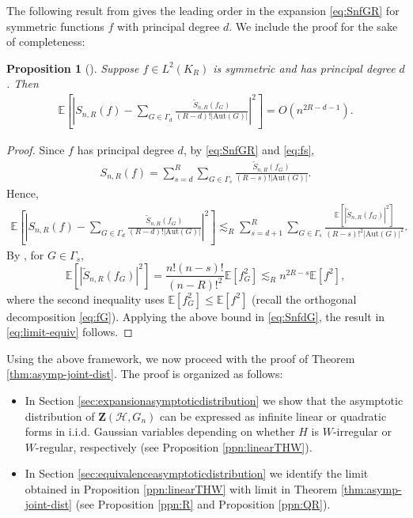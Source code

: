 \documentclass[11pt,reqno]{amsart}
\numberwithin{equation}{section}
\newcommand{\cH}{{\mathcal H}}
\newtheorem{prop}{Proposition}[section]
\theoremstyle{definition}
\begin{document}
The following result from  \cite{janson1991asymptotic} gives the leading order in the expansion \eqref{eq:SnfGR} for symmetric functions $f$ with principal degree $d$. We include the proof for the sake of completeness: 


\begin{prop}[\cite{janson1991asymptotic}]
\label{ppn:Sn}
Suppose $f \in L^{2}(K_R)$ is symmetric and has principal degree $d$. Then 
\begin{align}\label{eq:limit-equiv}
   \mathbb E\left[\left|S_{n,R}(f) - \sum_{G\in\Gamma_{d}}\frac{\tilde{S}_{n,R}(f_{G})}{(R-d)!|\mathrm{Aut}(G)|} \right|^2\right] = O(n^{2R - d -1}) .  
\end{align} 
\end{prop}

\begin{proof} 
Since $f$ has principal degree $d$, by \eqref{eq:SnfGR} and \eqref{eq:fs}, 
\begin{align*}
S_{n,R}(f) = \sum_{s=d}^R \sum_{G\in\Gamma_{s}}\frac{\tilde{S}_{n,R}(f_{G})}{(R-s)!|\mathrm{Aut}(G)|} . 
\end{align*} 
Hence, 
\begin{align}\label{eq:SnfdG}
\mathbb E \left[\left|S_{n,R}(f) - \sum_{G\in\Gamma_{d}}\frac{\tilde{S}_{n,R}(f_{G})}{(R-d)!|\mathrm{Aut}(G)|}  \right|^2\right]  \lesssim_R  \sum_{s=d+1}^R \sum_{G\in\Gamma_{s}}\frac{\mathbb E[|\tilde{S}_{n,R}(f_{G})|^2]}{(R-s)!^2|\mathrm{Aut}(G)|^2} .  
\end{align}
By \cite[Lemma 4]{janson1991asymptotic}, for $G \in \Gamma_s$,  
$$\mathbb E[|\tilde{S}_{n,R}(f_{G})|^2]  = \frac{n! (n- s)!}{(n-R)!^2} \mathbb E[f_G^2] \lesssim_R n^{2R -s} \mathbb E[f^2], $$
where the second inequality uses $\mathbb E[f_G^2] \leq \mathbb E[f^2]$ (recall the orthogonal decomposition \eqref{eq:fG}). 
Applying the above bound in \eqref{eq:SnfdG}, the result in \eqref{eq:limit-equiv} follows. 

\end{proof}

Using the above framework, we now proceed with the proof of Theorem \ref{thm:asymp-joint-dist}. The proof is organized as follows: 
\begin{itemize} 
\item In Section \ref{sec:expansionasymptoticdistribution} we show that the asymptotic distribution of $\bm{Z}(\cH, G_n)$ can be expressed as infinite linear or quadratic forms in i.i.d. Gaussian variables depending on whether $H$ is $W$-irregular or $W$-regular, respectively (see Proposition \ref{ppn:linearTHW}). 
\item In Section \ref{sec:equivalenceasymptoticdistribution} we identify the limit obtained in Proposition \ref{ppn:linearTHW} with limit in Theorem \ref{thm:asymp-joint-dist} (see Proposition \ref{ppn:R} and Proposition \ref{ppn:QR}). 
\end{itemize}
\end{document}
